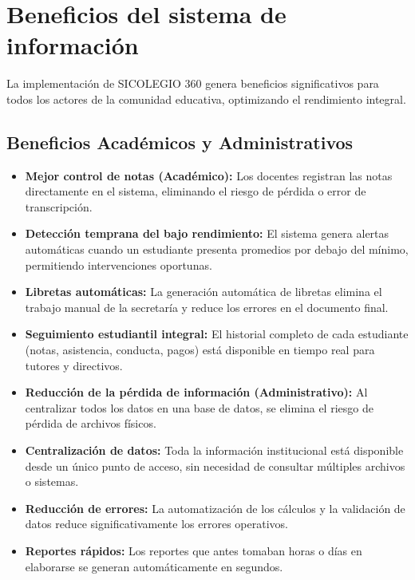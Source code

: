 \documentclass[12pt,a4paper,oneside]{report}
\begin{document}
\section{Beneficios del sistema de información}

La implementación de SICOLEGIO 360 genera beneficios significativos para todos los actores de la comunidad educativa, optimizando el rendimiento integral.

\subsection{Beneficios Académicos y Administrativos}
\begin{itemize}
  \item \textbf{Mejor control de notas (Académico):} Los docentes registran las notas directamente en el sistema, eliminando el riesgo de pérdida o error de transcripción.
  \item \textbf{Detección temprana del bajo rendimiento:} El sistema genera alertas automáticas cuando un estudiante presenta promedios por debajo del mínimo, permitiendo intervenciones oportunas.
  \item \textbf{Libretas automáticas:} La generación automática de libretas elimina el trabajo manual de la secretaría y reduce los errores en el documento final.
  \item \textbf{Seguimiento estudiantil integral:} El historial completo de cada estudiante (notas, asistencia, conducta, pagos) está disponible en tiempo real para tutores y directivos.
  \item \textbf{Reducción de la pérdida de información (Administrativo):} Al centralizar todos los datos en una base de datos, se elimina el riesgo de pérdida de archivos físicos.
  \item \textbf{Centralización de datos:} Toda la información institucional está disponible desde un único punto de acceso, sin necesidad de consultar múltiples archivos o sistemas.
  \item \textbf{Reducción de errores:} La automatización de los cálculos y la validación de datos reduce significativamente los errores operativos.
  \item \textbf{Reportes rápidos:} Los reportes que antes tomaban horas o días en elaborarse se generan automáticamente en segundos.
\end{itemize}
\end{document}

